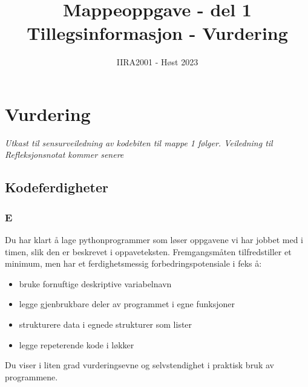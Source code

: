 \documentclass[12pt, titlepage]{article}
\begin{document}
\title{Mappeoppgave - del 1 \\ Tillegsinformasjon - Vurdering}
\author{IIRA2001 - Høst 2023}
\date{}
\maketitle

\section*{Vurdering}

\textit{Utkast til sensurveiledning av kodebiten til mappe 1 følger.  Veiledning til Refleksjonsnotat kommer senere}

\subsection*{Kodeferdigheter}

\subsubsection*{E}

Du har klart å lage pythonprogrammer som løser oppgavene vi har jobbet med i timen, slik den er beskrevet i oppaveteksten.
Fremgangsmåten tilfredstiller et minimum, men har et ferdighetsmessig forbedringspotensiale i feks å:
\begin{itemize}
	\item {bruke fornuftige deskriptive variabelnavn}
	\item {legge gjenbrukbare deler av programmet i egne funksjoner}
	\item {strukturere data i egnede strukturer som lister}
	\item {legge repeterende kode i løkker}
\end{itemize}
Du viser i liten grad vurderingsevne og selvstendighet i praktisk bruk av programmene.
\end{document}
